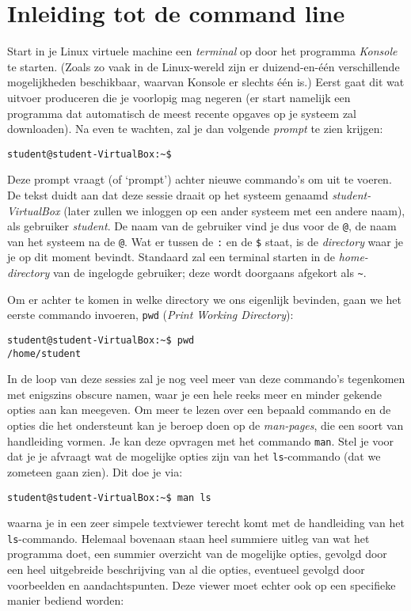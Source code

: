 \documentclass[a4paper,twoside,openany]{memoir}
\begin{document}
\chapter{Inleiding tot de command line}

Start in je Linux virtuele machine een \emph{terminal} op door het programma
\emph{Konsole} te starten. (Zoals zo vaak in de Linux-wereld zijn er
duizend-en-één verschillende mogelijkheden beschikbaar, waarvan Konsole er
slechts één is.) Eerst gaat dit wat uitvoer produceren die je voorlopig mag
negeren (er start namelijk een programma dat automatisch de meest recente
opgaves op je systeem zal downloaden). Na even te wachten, zal je dan volgende
\emph{prompt} te zien krijgen:

\begin{verbatim}
student@student-VirtualBox:~$ 
\end{verbatim}

Deze prompt vraagt (of `prompt') achter nieuwe commando's om uit te voeren. De
tekst duidt aan dat deze sessie draait op het systeem genaamd
\emph{student-VirtualBox} (later zullen we inloggen op een ander systeem met een
andere naam), als gebruiker \emph{student}. De naam van de gebruiker vind je dus
voor de \texttt{@}, de naam van het systeem na de \texttt{@}. Wat er tussen de
\texttt{:} en de \texttt{\$} staat, is de \emph{directory} waar je je op dit
moment bevindt. Standaard zal een terminal starten in de \emph{home-directory}
van de ingelogde gebruiker; deze wordt doorgaans afgekort als \texttt{\~}.

Om er achter te komen in welke directory we ons eigenlijk bevinden, gaan we het
eerste commando invoeren, \verb!pwd! (\emph{Print Working Directory}):

\begin{verbatim}
student@student-VirtualBox:~$ pwd
/home/student
\end{verbatim}

In de loop van deze sessies zal je nog veel meer van deze commando's tegenkomen
met enigszins obscure namen, waar je een hele reeks meer en minder gekende
opties aan kan meegeven. Om meer te lezen over een bepaald commando en de opties
die het ondersteunt kan je beroep doen op de \emph{man-pages}, die een soort van
handleiding vormen. Je kan deze opvragen met het commando \verb!man!. Stel je
voor dat je je afvraagt wat de mogelijke opties zijn van het \verb!ls!-commando
(dat we zometeen gaan zien). Dit doe je via:

\begin{verbatim}
student@student-VirtualBox:~$ man ls
\end{verbatim}
waarna je in een zeer simpele textviewer terecht komt met de handleiding van het
\verb!ls!-commando. Helemaal bovenaan staan heel summiere uitleg van wat het
programma doet, een summier overzicht van de mogelijke opties, gevolgd door een
heel uitgebreide beschrijving van al die opties, eventueel gevolgd door
voorbeelden en aandachtspunten. Deze viewer moet echter ook op een specifieke
manier bediend worden:
\end{document}
